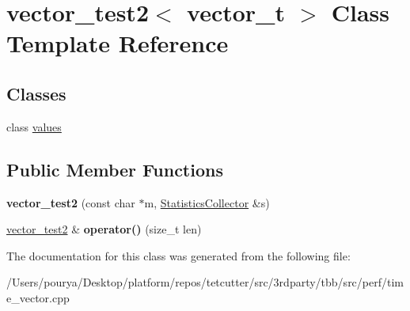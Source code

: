 \hypertarget{classvector__test2}{}\section{vector\+\_\+test2$<$ vector\+\_\+t $>$ Class Template Reference}
\label{classvector__test2}
\subsection*{Classes}
\begin{DoxyCompactItemize}
\item 
class \hyperlink{classvector__test2_1_1values}{values}
\end{DoxyCompactItemize}
\subsection*{Public Member Functions}
\begin{DoxyCompactItemize}
\item 
\hypertarget{classvector__test2_a1365211902467e4bf50bb4193d187bf9}{}{\bfseries vector\+\_\+test2} (const char $\ast$m, \hyperlink{classStatisticsCollector}{Statistics\+Collector} \&s)\label{classvector__test2_a1365211902467e4bf50bb4193d187bf9}

\item 
\hypertarget{classvector__test2_aa25ddc76200aa2d6325e766db28d4664}{}\hyperlink{classvector__test2}{vector\+\_\+test2} \& {\bfseries operator()} (size\+\_\+t len)\label{classvector__test2_aa25ddc76200aa2d6325e766db28d4664}

\end{DoxyCompactItemize}


The documentation for this class was generated from the following file\+:\begin{DoxyCompactItemize}
\item 
/\+Users/pourya/\+Desktop/platform/repos/tetcutter/src/3rdparty/tbb/src/perf/time\+\_\+vector.\+cpp\end{DoxyCompactItemize}
